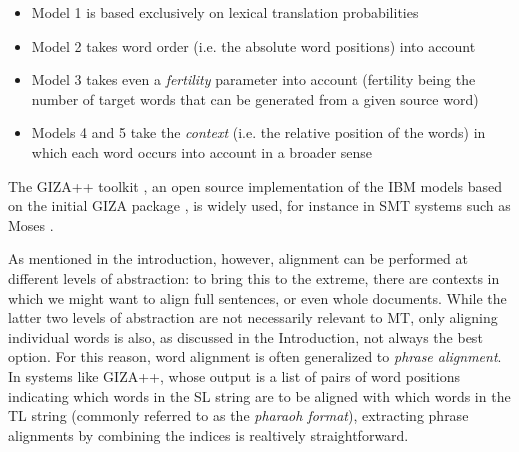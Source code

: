 \begin{itemize}
    \item Model 1 is based exclusively on lexical translation probabilities
    \item Model 2 takes word order (i.e. the absolute word positions) into account 
    \item Model 3 takes even a \textit{fertility} parameter into account (fertility being the number of target words that can be generated from a given source word)
    \item Models 4 and 5 take the \textit{context} (i.e. the relative position of the words) in which each word occurs into account in a broader sense
\end{itemize}

The GIZA++ toolkit \cite{gizapp}, an open source implementation of the IBM models based on the initial GIZA package \cite{giza}, is widely used, for instance in SMT systems such as Moses \cite{moses}. \smallskip

As mentioned in the introduction, however, alignment can be performed at different levels of abstraction: to bring this to the extreme, there are contexts in which we might want to align full sentences, or even whole documents. While the latter two levels of abstraction are not necessarily relevant to MT, only aligning individual words is also, as discussed in the Introduction, not always the best option. For this reason, word alignment is often generalized to \textit{phrase alignment}. In systems like GIZA++, whose output is a list of pairs of word positions indicating which words in the SL string are to be aligned with which words in the TL string (commonly referred to as the \textit{pharaoh format}), extracting phrase alignments by combining the indices is realtively straightforward. \smallskip 

